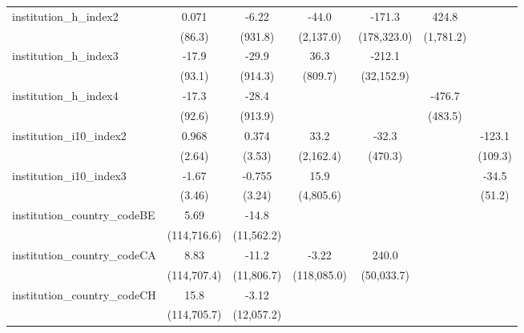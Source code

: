 \begin{tabular}{lcccccc}
   institution\_h\_index2                & 0.071        & -6.22        & -44.0        & -171.3       & 424.8          &   \\   
                                         & (86.3)       & (931.8)      & (2,137.0)    & (178,323.0)  & (1,781.2)      &   \\   
   institution\_h\_index3                & -17.9        & -29.9        & 36.3         & -212.1       &                &   \\   
                                         & (93.1)       & (914.3)      & (809.7)      & (32,152.9)   &                &   \\   
   institution\_h\_index4                & -17.3        & -28.4        &              &              & -476.7         &   \\   
                                         & (92.6)       & (913.9)      &              &              & (483.5)        &   \\   
   institution\_i10\_index2              & 0.968        & 0.374        & 33.2         & -32.3        &                & -123.1\\   
                                         & (2.64)       & (3.53)       & (2,162.4)    & (470.3)      &                & (109.3)\\   
   institution\_i10\_index3              & -1.67        & -0.755       & 15.9         &              &                & -34.5\\   
                                         & (3.46)       & (3.24)       & (4,805.6)    &              &                & (51.2)\\   
   institution\_country\_codeBE          & 5.69         & -14.8        &              &              &                &   \\   
                                         & (114,716.6)  & (11,562.2)   &              &              &                &   \\   
   institution\_country\_codeCA          & 8.83         & -11.2        & -3.22        & 240.0        &                &   \\   
                                         & (114,707.4)  & (11,806.7)   & (118,085.0)  & (50,033.7)   &                &   \\   
   institution\_country\_codeCH          & 15.8         & -3.12        &              &              &                &   \\   
                                         & (114,705.7)  & (12,057.2)   &              &              &                &   \\   

\end{tabular}
